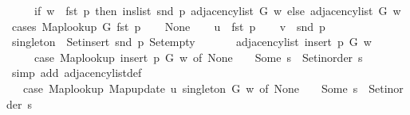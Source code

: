 \begin{isabellebody}
\ \ \ \ \ {\isacharparenleft}{\kern0pt}if\ w\ {\isacharequal}{\kern0pt}\ fst\ p\ then\ ins{\isacharunderscore}{\kern0pt}list\ {\isacharparenleft}{\kern0pt}snd\ p{\isacharparenright}{\kern0pt}\ {\isacharparenleft}{\kern0pt}adjacency{\isacharunderscore}{\kern0pt}list\ G\ w{\isacharparenright}{\kern0pt}\ else\ adjacency{\isacharunderscore}{\kern0pt}list\ G\ w{\isacharparenright}{\kern0pt}{\isachardoublequoteclose}\isanewline
%
\isadelimproof
%
\endisadelimproof
%
\isatagproof
{}\isamarkupfalse%
\ {\isacharparenleft}{\kern0pt}cases\ {\isachardoublequoteopen}Map{\isacharunderscore}{\kern0pt}lookup\ G\ {\isacharparenleft}{\kern0pt}fst\ p{\isacharparenright}{\kern0pt}{\isachardoublequoteclose}{\isacharparenright}{\kern0pt}\isanewline
\ \ \isamarkupfalse%
\ None\isanewline
\ \ \isamarkupfalse%
\ {\isacharquery}{\kern0pt}u\ {\isacharequal}{\kern0pt}\ {\isachardoublequoteopen}fst\ p{\isachardoublequoteclose}\isanewline
\ \ \isamarkupfalse%
\ {\isacharquery}{\kern0pt}v\ {\isacharequal}{\kern0pt}\ {\isachardoublequoteopen}snd\ p{\isachardoublequoteclose}\isanewline
\ \ \isamarkupfalse%
\ {\isacharquery}{\kern0pt}singleton\ {\isacharequal}{\kern0pt}\ {\isachardoublequoteopen}Set{\isacharunderscore}{\kern0pt}insert\ {\isacharparenleft}{\kern0pt}snd\ p{\isacharparenright}{\kern0pt}\ Set{\isacharunderscore}{\kern0pt}empty{\isachardoublequoteclose}\isanewline
\ \ \isamarkupfalse%
\isanewline
\ \ \ \ {\isachardoublequoteopen}adjacency{\isacharunderscore}{\kern0pt}list\ {\isacharparenleft}{\kern0pt}insert\ p\ G{\isacharparenright}{\kern0pt}\ w\ {\isacharequal}{\kern0pt}\isanewline
\ \ \ \ \ {\isacharparenleft}{\kern0pt}case\ Map{\isacharunderscore}{\kern0pt}lookup\ {\isacharparenleft}{\kern0pt}insert\ p\ G{\isacharparenright}{\kern0pt}\ w\ of\ None\ {\isasymRightarrow}\ {\isacharbrackleft}{\kern0pt}{\isacharbrackright}{\kern0pt}\ {\isacharbar}{\kern0pt}\ Some\ s\ {\isasymRightarrow}\ Set{\isacharunderscore}{\kern0pt}inorder\ s{\isacharparenright}{\kern0pt}{\isachardoublequoteclose}\isanewline
\ \ \ \ \isamarkupfalse%
\ {\isacharparenleft}{\kern0pt}simp\ add{\isacharcolon}{\kern0pt}\ adjacency{\isacharunderscore}{\kern0pt}list{\isacharunderscore}{\kern0pt}def{\isacharparenright}{\kern0pt}\isanewline
\ \ \isamarkupfalse%
\ \isamarkupfalse%
\ {\isachardoublequoteopen}{\isachardot}{\kern0pt}{\isachardot}{\kern0pt}{\isachardot}{\kern0pt}\ {\isacharequal}{\kern0pt}\ {\isacharparenleft}{\kern0pt}case\ Map{\isacharunderscore}{\kern0pt}lookup\ {\isacharparenleft}{\kern0pt}Map{\isacharunderscore}{\kern0pt}update\ {\isacharquery}{\kern0pt}u\ {\isacharquery}{\kern0pt}singleton\ G{\isacharparenright}{\kern0pt}\ w\ of\ None\ {\isasymRightarrow}\ {\isacharbrackleft}{\kern0pt}{\isacharbrackright}{\kern0pt}\ {\isacharbar}{\kern0pt}\ Some\ s\ {\isasymRightarrow}\ Set{\isacharunderscore}{\kern0pt}inorder\ s{\isacharparenright}{\kern0pt}{\isachardoublequoteclose}\isanewline

\end{isabellebody}
